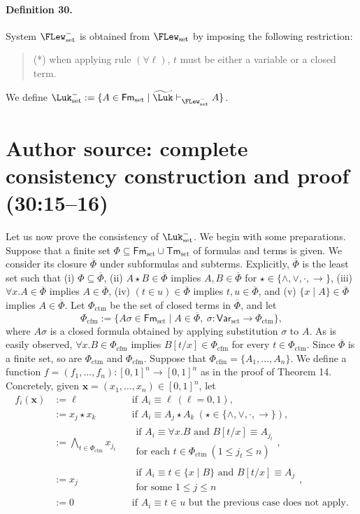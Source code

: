 \paragraph{Definition 30.} System $\FLew_{\mathrm{set}}^{-}$ is obtained from $\FLew_{\mathrm{set}}$ by imposing the following restriction:
\begin{quote}
(*) when applying rule $(\forall\ell)$, $t$ must be either a variable or a closed term.
\end{quote}
We define $\Luk_{\mathrm{set}}^{-}:=\{A\in\mathsf{Fm}_{\mathrm{set}}\mid\widetilde{\Luk}\vdash_{\FLew_{\mathrm{set}}^{-}}A\}$.
\section*{Author source: complete consistency construction and proof (30:15--16)}
Let us now prove the consistency of $\Luk_{\mathrm{set}}^{-}$. We begin with some preparations. Suppose that a finite set $\Phi\subseteq\mathsf{Fm}_{\mathrm{set}}\cup\mathsf{Tm}_{\mathrm{set}}$ of formulas and terms is given. We consider its closure $\overline\Phi$ under subformulas and subterms. Explicitly, $\overline\Phi$ is the least set such that (i) $\Phi\subseteq\overline\Phi$, (ii) $A\star B\in\overline\Phi$ implies $A,B\in\overline\Phi$ for $\star\in\{\wedge,\vee,\cdot,\to\}$, (iii) $\forall x.A\in\overline\Phi$ implies $A\in\overline\Phi$, (iv) $(t\in u)\in\overline\Phi$ implies $t,u\in\overline\Phi$, and (v) $\{x\mid A\}\in\overline\Phi$ implies $A\in\overline\Phi$.
Let $\Phi_{\mathrm{ctm}}$ be the set of closed terms in $\overline\Phi$, and let
\[
 \Phi_{\mathrm{cfm}}:=\{A\sigma\in\mathsf{Fm}_{\mathrm{set}}\mid A\in\overline\Phi,\ \sigma:\mathsf{Var}_{\mathrm{set}}\to\Phi_{\mathrm{ctm}}\},
\]
where $A\sigma$ is a closed formula obtained by applying substitution $\sigma$ to $A$. As is easily observed, $\forall x.B\in\Phi_{\mathrm{cfm}}$ implies $B[t/x]\in\Phi_{\mathrm{cfm}}$ for every $t\in\Phi_{\mathrm{ctm}}$. Since $\overline\Phi$ is a finite set, so are $\Phi_{\mathrm{ctm}}$ and $\Phi_{\mathrm{cfm}}$.
Suppose that $\Phi_{\mathrm{cfm}}=\{A_1,\ldots,A_n\}$. We define a function $f=(f_1,\ldots,f_n):[0,1]^n\to[0,1]^n$ as in the proof of Theorem 14. Concretely, given $\mathbf x=(x_1,\ldots,x_n)\in[0,1]^n$, let
\[
\begin{aligned}
 f_i(\mathbf x)&:=\ell&&\text{if }A_i\equiv\ell\ (\ell=0,1),\\
 &:=x_j\star x_k&&\text{if }A_i\equiv A_j\star A_k\ (\star\in\{\wedge,\vee,\cdot,\to\}),\\
 &:=\bigwedge_{t\in\Phi_{\mathrm{ctm}}}x_{j_t}&&\substack{\text{if }A_i\equiv\forall x.B\text{ and }B[t/x]\equiv A_{j_t}\\\text{for each }t\in\Phi_{\mathrm{ctm}}\ (1\le j_t\le n)},\\
 &:=x_j&&\substack{\text{if }A_i\equiv t\in\{x\mid B\}\text{ and }B[t/x]\equiv A_j\\\text{for some }1\le j\le n},\\
 &:=0&&\text{if }A_i\equiv t\in u\text{ but the previous case does not apply.}
\end{aligned}
\]
